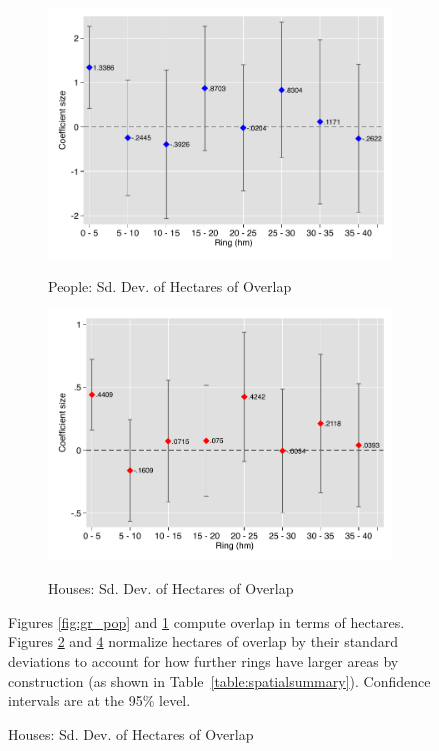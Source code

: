 \documentclass[12pt]{article}
\begin{document}
\begin{figure}[hbtp]
\begin{subfigure}[b]{.49\textwidth}
        \label{fig:gr_house}
    \end{subfigure}
        \vspace{2mm}
    \label{fig:gr_coef_sd}
    \begin{subfigure}[b]{.49\textwidth}
        \centering
        \caption[]{\small People: Sd. Dev. of Hectares of Overlap}  
        \vspace{-1mm}
        \includegraphics[width=\textwidth,trim={.2cm .2cm .2cm 0cm}, clip=true]{figures/gr_pop_sd.pdf}
        \label{fig:gr_pop_sd}
    \end{subfigure}
    \hfill
    \begin{subfigure}[b]{.49\textwidth}  
        \centering 
        \caption[]{\small Houses: Sd. Dev. of Hectares of Overlap}
        \vspace{-1mm}
        \includegraphics[width=\textwidth,trim={.2cm .2cm .2cm 0cm}, clip=true]{figures/gr_house_sd.pdf}
        \label{fig:gr_house_sd}
    \end{subfigure}
{\footnotesize Figures \ref{fig:gr_pop} and \ref{fig:gr_house} compute overlap in terms of hectares.  Figures \ref{fig:gr_pop_sd} and \ref{fig:gr_house_sd} normalize hectares of overlap by their standard deviations to account for how further rings have larger areas by construction (as shown in Table~\ref{table:spatialsummary}).  Confidence intervals are at the 95\% level. }
\end{figure} 
\end{document}
